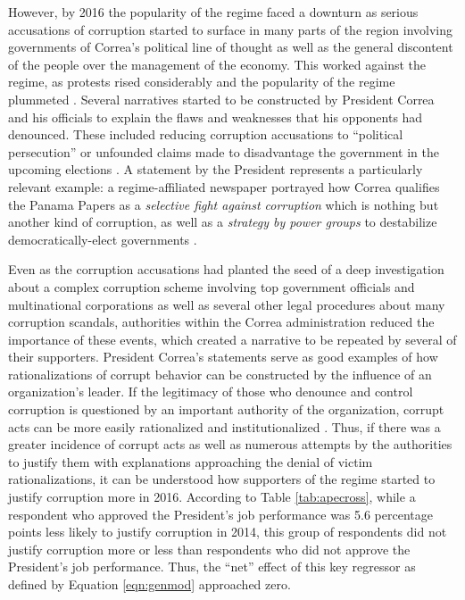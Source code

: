 \documentclass[floatsintext,man]{apa7}\usepackage[]{graphicx}\usepackage[]{color}
\begin{document}
However, by 2016 the popularity of the regime faced a downturn as serious accusations of corruption started to surface \parencite{Sarango.2017} in many parts of the region involving governments of Correa's political line of thought as well as the general discontent of the people over the management of the economy. This worked against the regime, as protests rised considerably and the popularity of the regime plummeted \parencite{Melendez.2017}. Several narratives started to be constructed by President Correa and his officials to explain the flaws and weaknesses that his opponents had denounced. These included reducing corruption accusations to \enquote{political persecution} or unfounded claims \parencite{Moreno.2016} made to disadvantage the government in the upcoming elections \parencite{Melendez.2017}. A statement by the President represents a particularly relevant example: a regime-affiliated newspaper portrayed how Correa qualifies the Panama Papers as a \textit{selective fight against corruption} which is nothing but another kind of corruption, as well as a \textit{strategy by power groups} to destabilize democratically-elect governments \parencite[para. 5-7]{Telegrafo.2016}. 

Even as the corruption accusations had planted the seed of a deep investigation about a complex corruption scheme involving top government officials and multinational corporations \parencite{Villavicencio.2019} as well as several other legal procedures about many corruption scandals, authorities within the Correa administration reduced the importance of these events, which created a narrative to be repeated by several of their supporters. President Correa's statements serve as good examples of how rationalizations of corrupt behavior can be constructed by the influence of an organization's leader. If the legitimacy of those who denounce and control corruption is questioned by an important authority of the organization, corrupt acts can be more easily rationalized and institutionalized \parencite{Ashforth.2003}. Thus, if there was a greater incidence of corrupt acts as well as numerous attempts by the authorities to justify them with explanations approaching the denial of victim rationalizations, it can be understood how supporters of the regime started to justify corruption more in 2016. According to Table \ref{tab:apecross}, while a respondent who approved the President's job performance was 5.6 percentage points less likely to justify corruption in 2014, this group of respondents did not justify corruption more or less than respondents who did not approve the President's job performance. Thus, the \enquote{net} effect of this key regressor as defined by Equation \ref{eqn:genmod} approached zero. 
\end{document}

